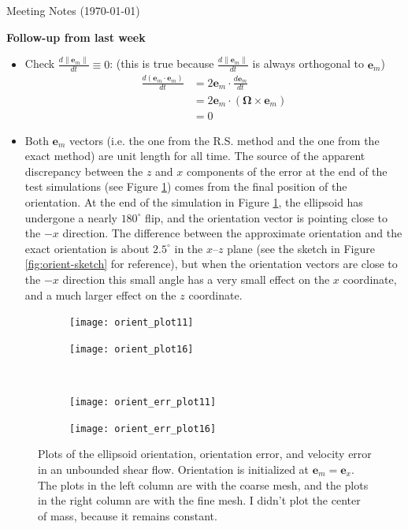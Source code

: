 \documentclass{article}
\newcommand{\dd}{d}
\newcommand{\Der}[2]{\frac{\dd #1}{\dd #2}}
\newcommand{\vect}[1]{\boldsymbol{\mathbf{#1}}}
\begin{document}
\pagestyle{plain}

\begin{center}
  {\Large Meeting Notes (\today)}
\end{center}

{\large \textbf{Follow-up from last week}}

\begin{itemize}
\item Check $\displaystyle{\Der{\|\vect{e}_m\|}{t} \equiv 0}$: (this
  is true because $\displaystyle{\Der{\|\vect{e}_m\|}{t}}$ is always
  orthogonal to $\vect{e}_m$)
  \begin{align*}
    \Der{(\vect{e}_m \cdot \vect{e}_m)}{t}
    &= 2 \vect{e}_m \cdot \Der{\vect{e}_m}{t} \\
    &= 2 \vect{e}_m \cdot \left(\vect{\Omega} \times \vect{e}_m
      \right) \\
    &= 0
  \end{align*}
\item Both $\vect{e}_m$ vectors (i.e. the one from the R.S. method and
  the one from the exact method) are unit length for all time. The
  source of the apparent discrepancy between the $z$ and $x$
  components of the error at the end of the test simulations (see
  Figure \ref{fig:first-free-test}) comes from the final position of
  the orientation. At the end of the simulation in Figure
  \ref{fig:first-free-test}, the ellipsoid has undergone a nearly
  $180^\circ$ flip, and the orientation vector is pointing close to
  the $-x$ direction. The difference between the approximate
  orientation and the exact orientation is about $2.5^\circ$ in the
  $x$--$z$ plane (see the sketch in Figure \ref{fig:orient-sketch} for
  reference), but when the orientation vectors are close to the $-x$
  direction this small angle has a very small effect on the $x$
  coordinate, and a much larger effect on the $z$ coordinate.
\end{itemize}

\begin{figure}
  \centering
  \begin{subfigure}{0.49\textwidth}
    \texttt{[image: orient\_plot11]}
  \end{subfigure}
  \hfill
  \begin{subfigure}{0.49\textwidth}
    \texttt{[image: orient\_plot16]}
  \end{subfigure}
  \\
  \begin{subfigure}{0.49\textwidth}
    \texttt{[image: orient\_err\_plot11]}
  \end{subfigure}
  \hfill
  \begin{subfigure}{0.49\textwidth}
    \texttt{[image: orient\_err\_plot16]}
  \end{subfigure}
  \caption{Plots of the ellipsoid orientation, orientation error, and
    velocity error in an unbounded shear flow. Orientation is
    initialized at $\vect{e}_m = \vect{e}_x$. The plots in the left
    column are with the coarse mesh, and the plots in the right column
    are with the fine mesh. I didn't plot the center of mass, because
    it remains constant.}
  \label{fig:first-free-test}
\end{figure}
\end{document}
